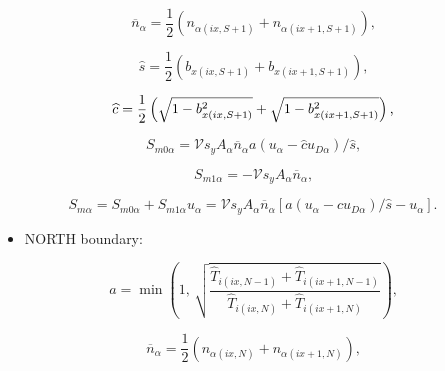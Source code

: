 \documentclass[11pt]{article}
\begin{document}
\begin{equation}
\overline{n}_{\alpha}=\frac{1}{2}\left( n_{\alpha\left( ix,S+1\right)
}+n_{\alpha\left( ix+1,S+1\right) }\right) \text{,}   \label{c136}
\end{equation}

\begin{equation}
\widehat{s}=\frac{1}{2}\left( b_{x\left( ix,S+1\right) }+b_{x\left(
ix+1,S+1\right) }\right) \text{,}   \label{c137}
\end{equation}

\begin{equation}
\widehat{c}=\frac{1}{2}\left( \sqrt{1-b_{x\left( ix,S+1\right) }^{2}}+\sqrt{%
1-b_{x\left( ix+1,S+1\right) }^{2}}\right) \text{,}   \label{c138}
\end{equation}

\begin{equation}
S_{m0\alpha}=\mathcal{V}s_{y}A_{\alpha}\overline{n}_{\alpha}a\left(
u_{\alpha}-\widehat{c}u_{D\alpha}\right) /\widehat{s}\text{,}   \label{c139}
\end{equation}

\begin{equation}
S_{m1\alpha}=-\mathcal{V}s_{y}A_{\alpha}\overline{n}_{\alpha}\text{,} 
\label{c140}
\end{equation}

\begin{equation}
S_{m\alpha}=S_{m0\alpha}+S_{m1\alpha}u_{\alpha}=\mathcal{V}s_{y}A_{\alpha }%
\overline{n}_{\alpha}\left[ a\left( u_{\alpha}-\widehat{c}u_{D\alpha
}\right) /\widehat{s}-u_{\alpha}\right] \text{.}   \label{c141}
\end{equation}

\bigskip

\begin{itemize}
\item  NORTH boundary:
\end{itemize}

\bigskip

\begin{equation}
a=\min\left( 1\text{, }\sqrt{\frac{\widehat{T}_{i\left( ix,N-1\right) }+%
\widehat{T}_{i\left( ix+1,N-1\right) }}{\widehat{T}_{i\left( ix,N\right) }+%
\widehat{T}_{i\left( ix+1,N\right) }}}\right) \text{,}   \label{c142}
\end{equation}

\begin{equation}
\overline{n}_{\alpha}=\frac{1}{2}\left( n_{\alpha\left( ix,N\right)
}+n_{\alpha\left( ix+1,N\right) }\right) \text{,}   \label{c143}
\end{equation}
\end{document}
